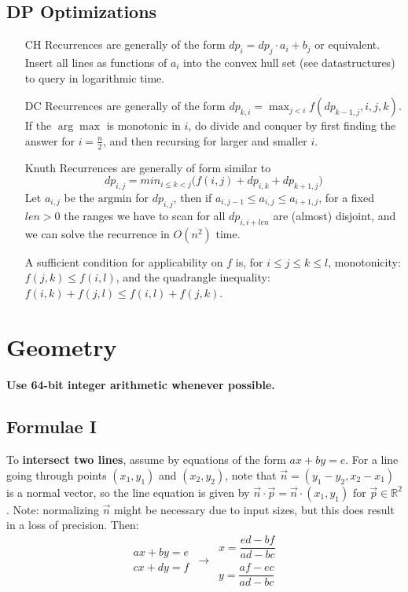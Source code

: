 \documentclass[
	a4paper,
	landscape,
	10pt,
	article
]{article}
\begin{document}
\subsection{DP Optimizations}
\begin{enumerate}
	\item[CH] Recurrences are generally of the form
		$dp_i = dp_j \cdot a_i + b_j$ or equivalent. Insert all lines as
		functions of $a_i$ into the convex hull set (see datastructures) to
		query in logarithmic time.
	\item[DC] Recurrences are generally of the form
		$dp_{k,i} = \max_{j<i} f(dp_{k-1,j}, i, j, k)$. If the $\arg\max$ is
		monotonic in $i$, do divide and conquer by first finding the answer
		for $i = \frac{n}{2}$, and then recursing for larger and smaller $i$.
	\item[Knuth] Recurrences are generally of form similar to
		$$dp_{i,j} = min_{i\leq k<j} \big(f(i, j) + dp_{i,k} + dp_{k+1,j}\big)$$
		Let $a_{i,j}$ be the $\text{argmin}$ for $dp_{i, j}$, then if
		$a_{i,j-1} \leq a_{i, j} \leq a_{i+1,j}$, for a fixed $len > 0$ the
		ranges we have to scan for all $dp_{i, i+len}$ are (almost) disjoint,
		and we can solve the recurrence in $O(n^2)$ time.

		A sufficient condition for applicability on $f$ is, for
		$i\leq j\leq k\leq l$, monotonicity: $f(j,k) \leq f(i, l)$, and
		the quadrangle inequality: $f(i,k)+f(j,l)\leq f(i,l)+f(j,k)$.
\end{enumerate}

\section{Geometry}
\textbf{\color{red} Use 64-bit integer arithmetic whenever possible.}

\subsection{Formulae I}
To \textbf{intersect two lines}, assume by equations of the form
$ax + by = e$. For a line going through points $(x_1, y_1)$ and
$(x_2, y_2)$, note that $\vec{n} = (y_1 - y_2, x_2 - x_1)$ is a normal vector,
so the line equation is given by $\vec{n}\cdot\vec{p}
	 = \vec{n} \cdot (x_1, y_1)$ for
$\vec{p} \in \mathbb{R}^2$. Note: normalizing $\vec{n}$ might be necessary due
to input sizes, but this does result in a loss of precision. Then:
$$\begin{aligned}ax+by=e\\cx+dy=f\end{aligned}
\,\to\,
\begin{aligned}x=\dfrac{ed-bf}{ad-bc}\\y=\dfrac{af-ec}{ad-bc}\end{aligned}$$
\end{document}
